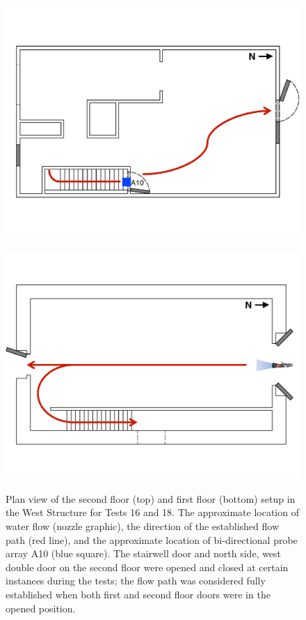 \documentclass[12pt,oneside]{book}
\begin{document}
\begin{figure}[!ht]
	\includegraphics[width=\columnwidth]{../Figures/Floor_Plans/Specific_Tests/West_Hose_Test_2nd_Floor_Annotated}
	\\~\\
	\includegraphics[width=\columnwidth]{../Figures/Floor_Plans/Specific_Tests/West_Hose_Test_18_1st_Floor_Annotated}
	\caption[Plan view of the West Structure setup for Tests 16 and 18.]{Plan view of the second floor (top) and first floor (bottom) setup in the West Structure for Tests 16 and 18. The approximate location of water flow (nozzle graphic), the direction of the established flow path (red line), and the approximate location of bi-directional probe array A10 (blue square). The stairwell door and north side, west double door on the second floor were opened and closed at certain instances during the tests; the flow path was considered fully established when both first and second floor doors were in the opened position.}
	\label{fig:flow_path_1}
\end{figure}
\end{document}
